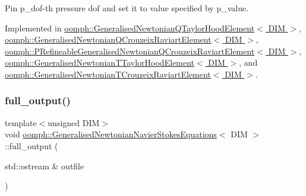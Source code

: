 Pin p\+\_\+dof-\/th pressure dof and set it to value specified by p\+\_\+value. 



Implemented in \hyperlink{classoomph_1_1GeneralisedNewtonianQTaylorHoodElement_afdaae310f7879fb9191b730cdf81ade1}{oomph\+::\+Generalised\+Newtonian\+Q\+Taylor\+Hood\+Element$<$ D\+I\+M $>$}, \hyperlink{classoomph_1_1GeneralisedNewtonianQCrouzeixRaviartElement_abbd85f033c570ea3d4e4033639436998}{oomph\+::\+Generalised\+Newtonian\+Q\+Crouzeix\+Raviart\+Element$<$ D\+I\+M $>$}, \hyperlink{classoomph_1_1PRefineableGeneralisedNewtonianQCrouzeixRaviartElement_aad3e0f421f695de35837393b7520d05a}{oomph\+::\+P\+Refineable\+Generalised\+Newtonian\+Q\+Crouzeix\+Raviart\+Element$<$ D\+I\+M $>$}, \hyperlink{classoomph_1_1GeneralisedNewtonianTTaylorHoodElement_a26ba51f8b7adebbd08e8969d622164d0}{oomph\+::\+Generalised\+Newtonian\+T\+Taylor\+Hood\+Element$<$ D\+I\+M $>$}, and \hyperlink{classoomph_1_1GeneralisedNewtonianTCrouzeixRaviartElement_a72e4201a4143b74992996e34df7eeb1f}{oomph\+::\+Generalised\+Newtonian\+T\+Crouzeix\+Raviart\+Element$<$ D\+I\+M $>$}.

\mbox{\label{classoomph_1_1GeneralisedNewtonianNavierStokesEquations_a37945b6f1c50cd8e559b9dadc131fb39}} 
\subsubsection{\texorpdfstring{full\+\_\+output()}{full\_output()}\hspace{0.1cm}{\footnotesize\ttfamily [1/2]}}
{\footnotesize\ttfamily template$<$unsigned D\+IM$>$ \\
void \hyperlink{classoomph_1_1GeneralisedNewtonianNavierStokesEquations}{oomph\+::\+Generalised\+Newtonian\+Navier\+Stokes\+Equations}$<$ D\+IM $>$\+::full\+\_\+output (\begin{DoxyParamCaption}\item[{std\+::ostream \&}]{outfile }\end{DoxyParamCaption})\hspace{0.3cm}{\ttfamily [inline]}}



